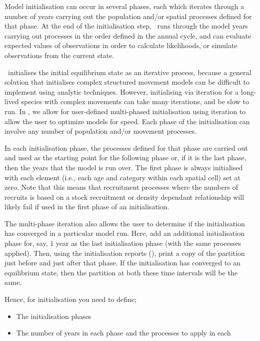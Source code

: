 Model initialisation can occur in several phases, each which iterates through a number of years carrying out the population and/or spatial processes defined for that phase. At the end of the initialisation step, \SPM\ runs through the model years carrying out processes in the order defined in the annual cycle, and can evaluate expected values of observations in order to calculate likelihoods, %
or simulate observations from the current state.

\SPM\ initialises the initial equilibrium state as an iterative process, because a general solution that initialises complex structured movement models can be difficult to implement using analytic techniques. However, initialising via iteration for a long-lived species with complex movements can take many iterations, and be slow to run. In \SPM, we allow for user-defined multi-phased initialisation using iteration to allow the user to optimize models for speed. Each phase of the initialisation can involve any number of population and/or movement processes. 

In each initialisation phase, the processes defined for that phase are carried out and used as the starting point for the following phase or, if it is the last phase, then the years that the model is run over. The first phase is always initialised with each element (i.e., each age and category within each spatial cell) set at zero. Note that this means that recruitment processes where the numbers of recruits is based on a stock recruitment or density dependant relationship will likely fail if used in the first phase of an initialisation. 

The multi-phase iteration also allows the user to determine if the initialisation has converged in a particular model run. Here, add an additional initialisation phase for, say, $1$ year as the last initialisation phase (with the same processes applied). Then, using the initialisation reports (), print a copy of the partition just before and just after that phase. If the initialisation has converged to an equilibrium state, then the partition at both these time intervals will be the same.

Hence, for initialisation you need to define;
\begin{itemize}
  \item The initialisation phases
  \item The number of years in each phase and the processes to apply in each
\end{itemize}

